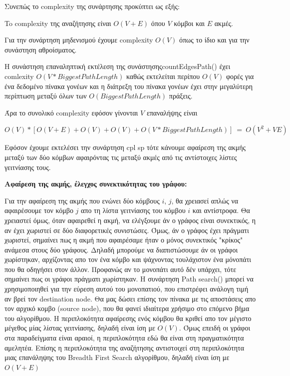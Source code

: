 \documentclass{article}
\begin{document}
Συνεπώς το complexity της συνάρτησης προκύπτει ως εξής:\bigbreak

To complexity της αναζήτησης είναι $Ο(V+E)$ όπου $V$ κόμβοι και $Ε$ ακμές.\bigbreak

Για την συνάρτηση μηδενισμού έχουμε complexity
$O(V)$ όπως το ίδιο και για την συνάστηση αθροίσματος.\bigbreak

Η συνάστηση επαναληπτική εκτέλεση της συνάστησηςcountEdgesPath() έχει comlexity
$O(V*Biggest Path Length)$ καθώς εκτελείται περίπου $Ο(V)$ φορές για ένα δεδομένο πίνακα γονέων και η διάτρεξη του πίνακα γονέων έχει στην μεγαλύτερη περίπτωση μεταξύ όλων των $Ο(Biggest Path Length)$ πράξεις.\bigbreak

Άρα το συνολικό complexity εφόσον γίνονται $V$ επαναλήψης είναι 

$Ο(V) * [O(V+E)+O(V)+O(V)+Ο(V*Biggest Path Length)] \ = \ O(V^2 + VE)$\bigbreak

Eφόσον έχουμε εκτελέσει την συνάρτηση cpl sp τότε κάνουμε αφαίρεση της ακμής μεταξύ των δύο κόμβων αφαιρόντας τις μεταξύ ακμές από τις αντίστοιχες λίστες γειτνίασης τους.\pagebreak

\textbf{Αφαίρεση της ακμής, έλεγχος συνεκτικότητας του γράφου:}\bigbreak

Για την αφαίρεση της ακμής που ενώνει δύο κόμβους $i$, $j$, θα χρειασεί απλώς να αφαιρέσουμε τον κόμβο $j$ απο τη λίστα γειτνίασης του κόμβου $i$ και αντίστροφα.
Θα χρειαστεί όμως, όταν αφαιρεθεί η ακμή, να ελέγξουμε άν ο γράφος είναι συνεκτικός, η αν έχει χωριστεί σε δύο διαφορετικές συνιστώσες. 
Όμως, άν ο γράφος έχει πράγματι χωριστεί, σημαίνει πως η ακμή που αφαιρέσαμε ήταν ο μόνος συνεκτικός "κρίκος" ανάμεσα στους δύο γράφους.
Δηλαδή μπορούμε να διαπιστώσουμε άν οι γράφοι χωρίστηκαν, αρχίζοντας απο τον ένα κόμβο και ψάχνοντας τουλάχιστον ένα μόνοπάτι που θα οδηγήσει στον άλλον.
Προφανώς αν το μονοπάτι αυτό δέν υπάρχει, τότε σημαίνει πως οι γράφοι πράγματι χωρίστηκαν.
Η συνάρτηση Path search() μπορεί να χρησιμοποιηθεί για την εύρεση αυτού του μονοπατιού, που επιστρέφει ανάλογη τιμή αν
βρεί τον destination node. Θα μας δώσει επίσης τον πίνακα με τις αποστάσεις απο τον αρχικό κομβο 
(source node), που θα φανεί ιδιαίτερα χρήσιμο στο επόμενο βήμα του αλγορίθμου.\bigbreak
Η περιπλοκότητα αφαίρεσης ενός κόμβου θα κριθεί απο τον μέγιστο μέγεθος μίας λίστας γειτνίασης, δηλαδή είναι ίση με $Ο(V)$. Όμως επειδή οι γράφοι στα παραδείγματα 
είναι αραιοί, η περιπλοκότητα εδώ θα είναι στη πραγματικότητα αμελητέα.
Επίσης η περιπλοκότητα της αναζήτησης αντιστοιχεί στη περιπλοκότητα μιας επανάληψης του  Breadth First Search
αλγορίθμου, δηλαδή είναι ίση με $Ο(V + Ε)$ \bigbreak
\end{document}
